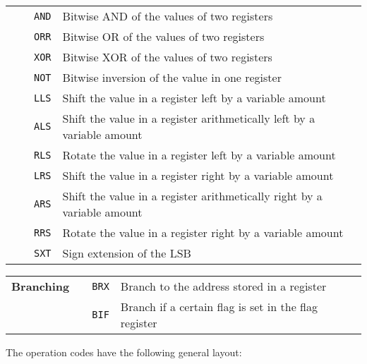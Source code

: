 \documentclass{report}
\newcounter{magicrownumbers}
\newcommand\rownumber{\stepcounter{magicrownumbers}\arabic{magicrownumbers}}
\begin{document}
\begin{table}[H]
\begin{longtable}{p{}p{}p{}p{}}
                     & \rownumber & \texttt{AND} & Bitwise AND of the values of two registers\\
                     & \rownumber & \texttt{ORR} & Bitwise OR of the values of two registers\\
                     & \rownumber & \texttt{XOR} & Bitwise XOR of the values of two registers\\
                     & \rownumber & \texttt{NOT} & Bitwise inversion of the value in one register\\
                     & \rownumber & \texttt{LLS} & Shift the value in a register left by a variable amount\\
                     & \rownumber & \texttt{ALS} & Shift the value in a register arithmetically left by a variable amount\\
                     & \rownumber & \texttt{RLS} & Rotate the value in a register left by a variable amount\\
                     & \rownumber & \texttt{LRS} & Shift the value in a register right by a variable amount\\
                     & \rownumber & \texttt{ARS} & Shift the value in a register arithmetically right by a variable amount\\
                     & \rownumber & \texttt{RRS} & Rotate the value in a register right by a variable amount\\
                     & \rownumber & \texttt{SXT} & Sign extension of the LSB\\
	\end{longtable}
	\begin{longtable}{p{}p{}p{}p{}}
        \textbf{Branching} & \rownumber & \texttt{BRX} & Branch to the address stored in a register\\
                           & \rownumber & \texttt{BIF} & Branch if a certain flag is set in the flag register\\
    \end{longtable}
\end{table}\noindent
The operation codes have the following general layout:\par
\end{document}
